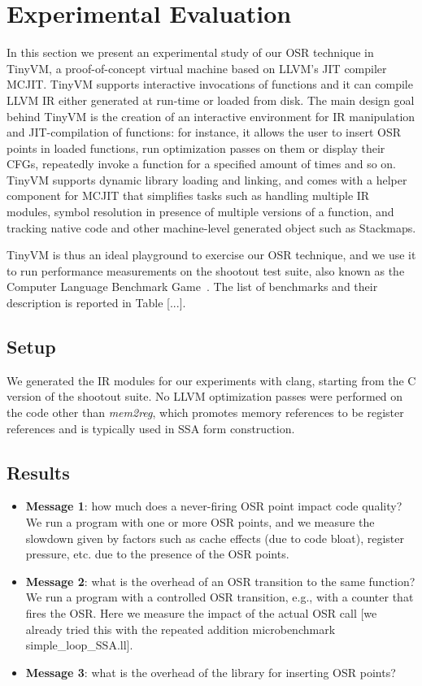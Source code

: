 \section{Experimental Evaluation}
\label{se:experiments}

In this section we present an experimental study of our OSR technique in TinyVM, a proof-of-concept virtual machine based on LLVM's JIT compiler MCJIT. TinyVM supports interactive invocations of functions and it can compile LLVM IR either generated at run-time or loaded from disk. The main design goal behind TinyVM is the creation of an interactive environment for IR manipulation and JIT-compilation of functions: for instance, it allows the user to insert OSR points in loaded functions, run optimization passes on them or display their CFGs, repeatedly invoke a function for a specified amount of times and so on. TinyVM supports dynamic library loading and linking, and comes with a helper component for MCJIT that simplifies tasks such as handling multiple IR modules, symbol resolution in presence of multiple versions of a function, and tracking native code and other machine-level generated object such as Stackmaps.

TinyVM is thus an ideal playground to exercise our OSR technique, and we use it to run performance measurements on the shootout test suite, also known as the Computer Language Benchmark Game~\cite{shootout}. The list of benchmarks and their description is reported in Table [...].

\subsection{Setup}

We generated the IR modules for our experiments with clang, starting from the C version of the shootout suite. No LLVM optimization passes were performed on the code other than {\em mem2reg}, which promotes memory references to be register references and is typically used in SSA form construction.

\subsection{Results}

\begin{itemize}
\item {\bf Message 1}: how much does a never-firing OSR point impact code quality? We run a program with one or more OSR points, and we measure the slowdown given by factors such as cache effects (due to code bloat), register pressure, etc. due to the presence of the OSR points.
\item {\bf Message 2}: what is the overhead of an OSR transition to the same function? We run a program with a controlled OSR transition, e.g., with a counter that fires the OSR. Here we measure the impact of the actual OSR call [we already tried this with the repeated addition microbenchmark simple\_loop\_SSA.ll].
\item {\bf Message 3}: what is the overhead of the library for inserting OSR points?
\end{itemize}

